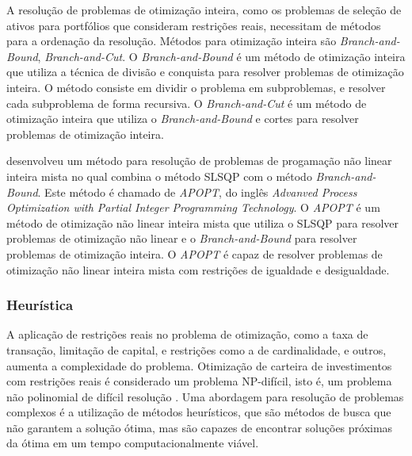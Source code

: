                 \ipar A resolução de problemas de otimização inteira, como os problemas de seleção de ativos para portfólios que consideram restrições reais, necessitam de métodos para a ordenação da resolução. Métodos para otimização inteira são \textit{Branch-and-Bound}, \textit{Branch-and-Cut}. O \textit{Branch-and-Bound} é um método de otimização inteira que utiliza a técnica de divisão e conquista para resolver problemas de otimização inteira. O método consiste em dividir o problema em subproblemas, e resolver cada subproblema de forma recursiva. O \textit{Branch-and-Cut} é um método de otimização inteira que utiliza o \textit{Branch-and-Bound} e cortes para resolver problemas de otimização inteira.

                \ipar {} desenvolveu um método para resolução de problemas de progamação não linear inteira mista no qual combina o método \acrshort{SLSQP} com o método \textit{Branch-and-Bound}. Este método é chamado de \textit{APOPT}, do inglês \textit{Advanved Process Optimization with Partial Integer Programming Technology}. O \textit{APOPT} é um método de otimização não linear inteira mista que utiliza o \acrshort{SLSQP} para resolver problemas de otimização não linear e o \textit{Branch-and-Bound} para resolver problemas de otimização inteira. O \textit{APOPT} é capaz de resolver problemas de otimização não linear inteira mista com restrições de igualdade e desigualdade.


            \subsubsection{Heurística}

                \ipar A aplicação de restrições reais no problema de otimização, como a taxa de transação, limitação de capital, e restrições como a de cardinalidade, e outros, aumenta a complexidade do problema. Otimização de carteira de investimentos com restrições reais é considerado um problema NP-difícil, isto é, um problema não polinomial de difícil resolução \cite{milhomem2020analysis}. Uma abordagem para resolução de problemas complexos é a utilização de métodos heurísticos, que são métodos de busca que não garantem a solução ótima, mas são capazes de encontrar soluções próximas da ótima em um tempo computacionalmente viável.


        
